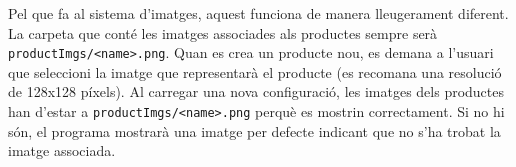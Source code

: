 \documentclass[a4paper,12pt]{article}
\begin{document}
	Pel que fa al sistema d’imatges, aquest funciona de manera lleugerament diferent. La carpeta que conté les imatges associades als productes sempre serà \texttt{productImgs/<name>.png}. Quan es crea un producte nou, es demana a l'usuari que seleccioni la imatge que representarà el producte (es recomana una resolució de 128x128 píxels). Al carregar una nova configuració, les imatges dels productes han d’estar a \texttt{productImgs/<name>.png} perquè es mostrin correctament. Si no hi són, el programa mostrarà una imatge per defecte indicant que no s’ha trobat la imatge associada.
\end{document}
